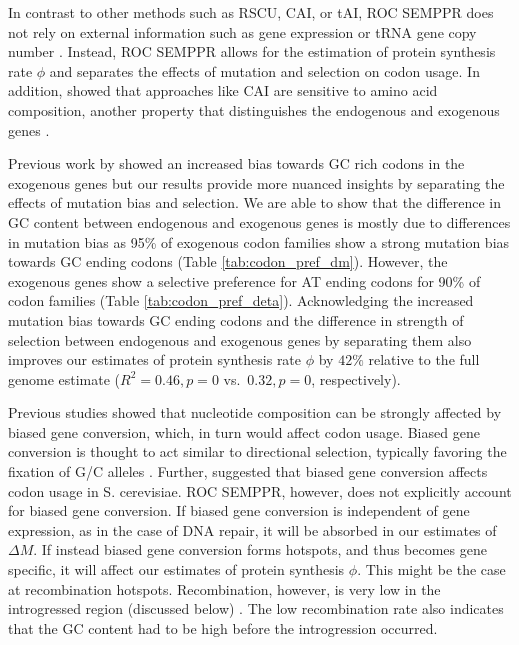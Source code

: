 \documentclass[doublespacing,linenumbers]{bmcart-modified}
\newcommand{\ROC}{ROC SEMPPR\xspace}
\newcommand{\GC}{GC content\xspace}
\newcommand{\DM}{\ensuremath{{\Delta M}}\xspace}
\begin{document}
In contrast to other methods such as RSCU, CAI, or tAI, \ROC does not rely on external information such as gene expression or tRNA gene copy number \cite{sharp1987, dosreis2004}.
Instead, \ROC allows for the estimation of protein synthesis rate $\phi$ and separates the effects of mutation and selection on codon usage.
In addition, \cite{cope2018} showed that approaches like CAI are sensitive to amino acid composition, another property that distinguishes the endogenous and exogenous genes \cite{payen2009}.

Previous work by \cite{payen2009} showed an increased bias towards GC rich codons in the exogenous genes but our results provide more nuanced insights by separating the effects of mutation bias and selection.
We are able to show that the difference in \GC between endogenous and exogenous genes is mostly due to differences in mutation bias as 95\% of exogenous codon families show a strong mutation bias towards GC ending codons (Table \ref{tab:codon_pref_dm}).
However, the exogenous genes show a selective preference for AT ending codons for 90\% of codon families (Table \ref{tab:codon_pref_deta}).
Acknowledging the increased mutation bias towards GC ending codons and the difference in strength of selection between endogenous and exogenous genes by separating them also improves our estimates of protein synthesis rate $\phi$ by $42 \%$ relative to the full genome estimate ($R^2 = 0.46, p = 0$ vs.~$0.32, p = 0$, respectively).

Previous studies showed that nucleotide composition can be strongly affected by biased gene conversion, which, in turn would affect codon usage.
Biased gene conversion is thought to act similar to directional selection, typically favoring the fixation of G/C alleles \cite{nagylaki1983a, nagylaki1983b}. 
Further, \cite[Harrison \& Charlesworth]{harrison2011} suggested that biased gene conversion affects codon usage in S. cerevisiae.
\ROC, however, does not explicitly account for biased gene conversion.
If biased gene conversion is independent of gene expression, as in the case of DNA repair, it will be absorbed in our estimates of \DM.
If instead biased gene conversion forms hotspots, and thus becomes gene specific, it will affect our estimates of protein synthesis $\phi$.
This might be the case at recombination hotspots.
Recombination, however, is very low in the introgressed region (discussed below) \cite{payen2009, brion2017}.
The low recombination rate also indicates that the \GC had to be high before the introgression occurred.
\end{document}
